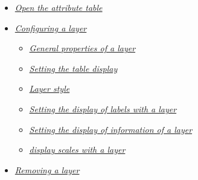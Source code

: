\documentclass[letterpaper,10pt,english]{sphinxmanual}
\begin{document}
{\begin{minipage}{0.95\linewidth}
\begin{itemize}
\begin{itemize}
\begin{itemize}
\item {} 
\label{maps/layerstree:id12}{\hyperref[maps/layerstree:ouvrir-la-table-d-attributs]{\emph{Open the attribute table}}}

\item {} 
\label{maps/layerstree:id13}{\hyperref[maps/layerstree:configuration-d-une-couche]{\emph{Configuring a layer}}}
\begin{itemize}
\item {} 
\label{maps/layerstree:id14}{\hyperref[maps/layerstree:proprietes-generales-d-une-couche]{\emph{General properties of a layer}}}

\item {} 
\label{maps/layerstree:id15}{\hyperref[maps/layerstree:parametrage-de-l-affichage-de-la-table]{\emph{Setting the table display}}}

\item {} 
\label{maps/layerstree:id16}{\hyperref[maps/layerstree:style-d-une-couche]{\emph{Layer style}}}

\item {} 
\label{maps/layerstree:id17}{\hyperref[maps/layerstree:parametrage-de-l-affichage-des-etiquettes-d-une-couche]{\emph{Setting the display of labels with a layer}}}

\item {} 
\label{maps/layerstree:id18}{\hyperref[maps/layerstree:parametrage-de-l-affichage-des-informations-d-une-couche]{\emph{Setting the display of information of a layer}}}

\item {} 
\label{maps/layerstree:id19}{\hyperref[maps/layerstree:echelles-d-affichage-d-une-couche]{\emph{display scales with a layer}}}

\end{itemize}

\item {} 
\label{maps/layerstree:id20}{\hyperref[maps/layerstree:suppression-d-une-couche]{\emph{Removing a layer}}}

\end{itemize}

\end{itemize}

\end{itemize}
\end{minipage}}
\begin{center}\setlength{\fboxsep}{5pt}\end{center}
\end{document}
